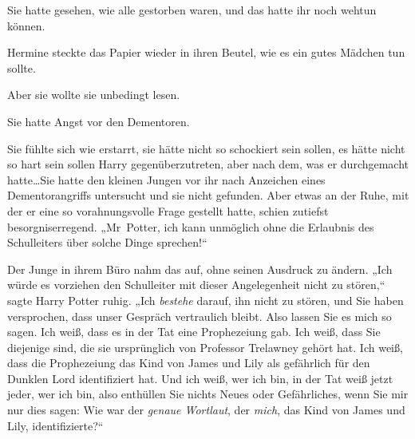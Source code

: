 Sie hatte gesehen, wie alle gestorben waren, und das hatte ihr noch wehtun können.

Hermine steckte das Papier wieder in ihren Beutel, wie es ein gutes Mädchen tun sollte.

Aber sie wollte sie unbedingt lesen.

Sie hatte Angst vor den Dementoren.


Sie fühlte sich wie erstarrt, sie hätte nicht so schockiert sein sollen, es hätte nicht so hart sein sollen Harry gegenüberzutreten, aber nach dem, was er durchgemacht hatte…Sie hatte den kleinen Jungen vor ihr nach Anzeichen eines Dementorangriffs untersucht und sie nicht gefunden. Aber etwas an der Ruhe, mit der er eine so vorahnungsvolle Frage gestellt hatte, schien zutiefst besorgniserregend. „Mr~Potter, ich kann unmöglich ohne die Erlaubnis des Schulleiters über solche Dinge sprechen!“

Der Junge in ihrem Büro nahm das auf, ohne seinen Ausdruck zu ändern. „Ich würde es vorziehen den Schulleiter mit dieser Angelegenheit nicht zu stören,“ sagte Harry Potter ruhig. „Ich \emph{bestehe} darauf, ihn nicht zu stören, und Sie haben versprochen, dass unser Gespräch vertraulich bleibt. Also lassen Sie es mich so sagen. Ich weiß, dass es in der Tat eine Prophezeiung gab. Ich weiß, dass Sie diejenige sind, die sie ursprünglich von Professor Trelawney gehört hat. Ich weiß, dass die Prophezeiung das Kind von James und Lily als gefährlich für den Dunklen Lord identifiziert hat. Und ich weiß, wer ich bin, in der Tat weiß jetzt jeder, wer ich bin, also enthüllen Sie nichts Neues oder Gefährliches, wenn Sie mir nur dies sagen: Wie war der \emph{genaue Wortlaut}, der \emph{mich}, das Kind von James und Lily, identifizierte?“


